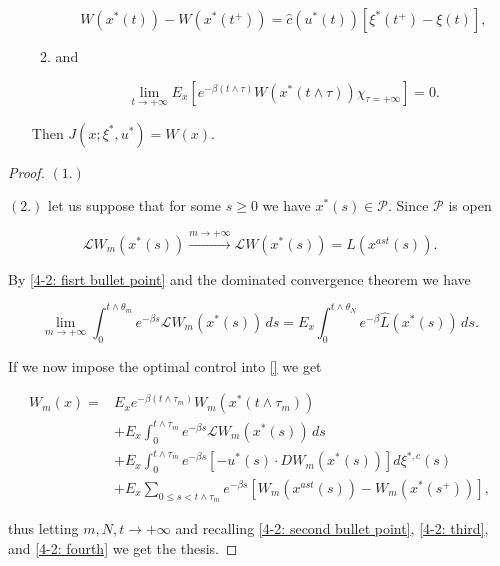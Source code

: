 \begin{theorem}
\begin{enumerate}[label=(\arabic*.)]
\begin{enumerate}[label=(2.\alph*.)]
            \[W(x^{\ast}(t)) - W(x^{\ast}(t^+)) = \hat{c}(u^{\ast}(t))\left[\xi^{\ast}(t^+) - \xi(t)\right],\]
            
            \item \label{4-2: fourth} and 
            
            \[\lim_{t\to+\infty} E_x\left[e^{-\beta(t\land\tau)}W(x^{\ast}(t\land\tau))\chi_{\tau=+\infty}\right] = 0.\]
        \end{enumerate}

        Then $J(x;\xi^{\ast},u^{\ast}) = W(x)$.
    \end{enumerate}

    \begin{proof}
        $(\textit{1}.)$ 

        $(\textit{2}.)$ let us suppose that for some $s\geq0$ we have $x^{\ast}(s)\in\mathcal{P}$. Since $\mathcal{P}$ is open

        \[\mathcal{L}W_m(x^{\ast}(s))\xrightarrow{m\to+\infty}\mathcal{L}W(x^\ast(s))=\hat{L}(x^{ast}(s)).\]

        By \ref{4-2: fisrt bullet point} and the dominated convergence theorem we have

        \begin{equation}
            \lim_{m\to+\infty}\int_0^{t\land\theta_m} e^{-\beta s}\mathcal{L}W_m(x^{\ast}(s))\,ds = E_{x}\int_0^{t\land\theta_N} e^{-\beta}\hat{L}(x^{\ast}(s))\,ds.
        \end{equation}

        If we now impose the optimal control into \eqref{} we get

        \begin{equation}
            \begin{aligned}
                W_m(x) = & E_xe^{-\beta (t\land\tau_m)}W_m(x^{\ast}(t\land\tau_m)) \\
                & + E_x \int_0^{t\land\tau_m} e^{-\beta s} \mathcal{L}W_m(x^{\ast}(s))\,ds \\
                & + E_x \int_0^{t\land\tau_m} e^{-\beta s} \left[-u^{\ast}(s)\cdot DW_m(x^{\ast}(s))\right]d\xi^{\ast,c}(s) \\
                & + E_x \sum_{0\leq s< t\land \tau_m} e^{-\beta s}\left[W_m(x^{ast}(s)) - W_m(x^{\ast}(s^+))\right],
            \end{aligned}
        \end{equation}

        thus letting $m,N,t\to+\infty$ and recalling \ref{4-2: second bullet point}, \ref{4-2: third}, and \ref{4-2: fourth} we get the thesis.
    \end{proof}
\end{theorem}


